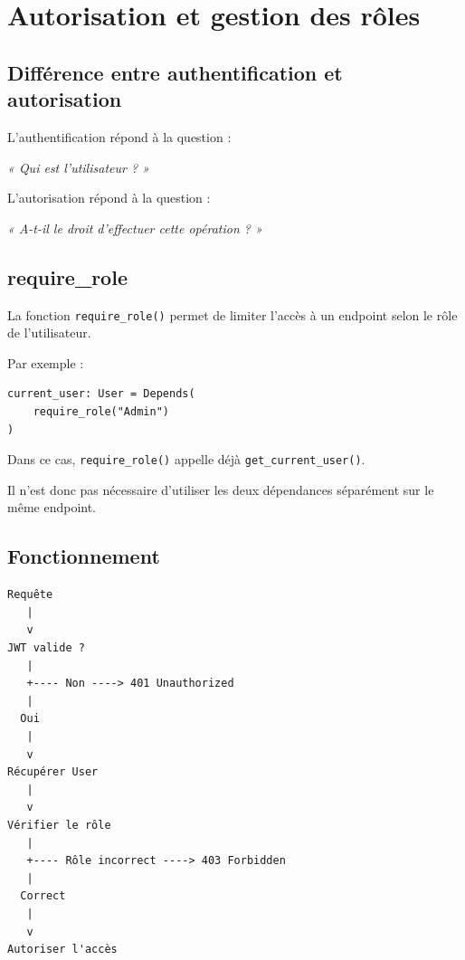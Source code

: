 \documentclass[12pt,a4paper]{report}
\begin{document}


\chapter{Autorisation et gestion des rôles}

\section{Différence entre authentification et autorisation}

L'authentification répond à la question :

\begin{center}
\textit{« Qui est l'utilisateur ? »}
\end{center}

L'autorisation répond à la question :

\begin{center}
\textit{« A-t-il le droit d'effectuer cette opération ? »}
\end{center}

\section{require\_role}

La fonction \texttt{require\_role()} permet de limiter l'accès à un
endpoint selon le rôle de l'utilisateur.

Par exemple :

\begin{lstlisting}
current_user: User = Depends(
    require_role("Admin")
)
\end{lstlisting}

Dans ce cas, \texttt{require\_role()} appelle déjà
\texttt{get\_current\_user()}.

Il n'est donc pas nécessaire d'utiliser les deux dépendances
séparément sur le même endpoint.

\section{Fonctionnement}

\begin{verbatim}
Requête
   |
   v
JWT valide ?
   |
   +---- Non ----> 401 Unauthorized
   |
  Oui
   |
   v
Récupérer User
   |
   v
Vérifier le rôle
   |
   +---- Rôle incorrect ----> 403 Forbidden
   |
  Correct
   |
   v
Autoriser l'accès
\end{verbatim}
\end{document}

